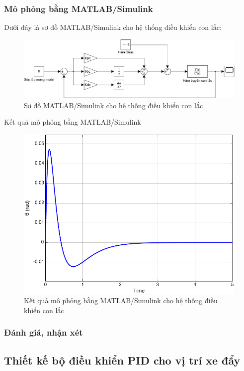\documentclass[12pt,a4paper]{article}
\begin{document}
\subsubsection{Mô phỏng bằng MATLAB/Simulink}

Dưới đây là sơ đồ MATLAB/Simulink cho hệ thống điều khiển con lắc: 
\begin{figure}[ht]
    \centering
    \includegraphics[width=\linewidth]{MATLAB_4.pdf}
    \caption{Sơ đồ MATLAB/Simulink cho hệ thống điều khiển con lắc}
\end{figure}

Kết quả mô phỏng bằng MATLAB/Simulink
\begin{figure}[ht]
    \centering
    \includegraphics[width=\linewidth]{MATLAB_5.pdf}
    \caption{Kết quả mô phỏng bằng MATLAB/Simulink cho hệ thống điều khiển con lắc}
\end{figure}

\subsubsection{Đánh giá, nhận xét}


\subsection{Thiết kế bộ điều khiển PID cho vị trí xe đẩy}
\end{document}
